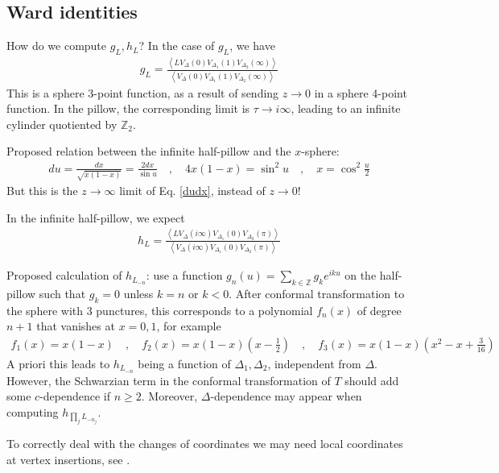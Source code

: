 \documentclass[12pt,a4paper]{article}
\begin{document}
\subsection{Ward identities}

How do we compute $g_L,h_L$? In the case of $g_L$, we have 
\begin{align}
 g_L = \frac{\left< LV_{\Delta}(0)V_{\Delta_1}(1)V_{\Delta_2}(\infty)\right>}{\left< V_{\Delta}(0)V_{\Delta_1}(1)V_{\Delta_2}(\infty)\right>}
\end{align}
This is a sphere 3-point function, as a result of sending $z\to 0$ in a sphere 4-point function. In the pillow, the corresponding limit is $\tau\to i\infty$, leading to an infinite cylinder quotiented by $\mathbb{Z}_2$. 

Proposed relation between the infinite half-pillow and the $x$-sphere:
\begin{align}
 du = \frac{dx}{\sqrt{x(1-x)}} = \frac{2dx}{\sin u} \quad , \quad 4x(1-x) = \sin^2u \quad , \quad x = \cos^2\tfrac{u}{2}
\end{align}
But this is the $z\to\infty$ limit of Eq. \eqref{dudx}, instead of $z\to 0$! 

In the infinite half-pillow, we expect
\begin{align}
 h_L = \frac{\left< LV_{\Delta}(i\infty)V_{\Delta_1}(0)V_{\Delta_2}(\pi)\right>}{\left< V_{\Delta}(i\infty)V_{\Delta_1}(0)V_{\Delta_2}(\pi)\right>}
\end{align}

Proposed calculation of $h_{L_{-n}}$: use a function $g_n(u)=\sum_{k\in\mathbb{Z}}g_k e^{iku} $ on the half-pillow such that $g_k=0$ unless $k=n$ or $k<0$. After conformal transformation to the sphere with 3 punctures, this corresponds to a polynomial $f_n(x)$ of degree $n+1$ that vanishes at $x=0,1$, for example 
\begin{align}
 f_1(x) = x(1-x) \quad , \quad f_2(x) = x(1-x)\left(x-\tfrac12\right) \quad ,\quad f_3(x) = x(1-x)\left(x^2-x+\tfrac{3}{16}\right)
\end{align}
A priori this leads to $h_{L_{-n}}$ being a function of $\Delta_1,\Delta_2$, independent from $\Delta$.
However, the Schwarzian term in the conformal transformation of $T$ should add some $c$-dependence if $n\geq 2$. Moreover, $\Delta$-dependence may appear when computing $h_{\prod_j L_{-n_j}}$. 

To correctly deal with the changes of coordinates we may need local coordinates at vertex insertions, see \cite[Section 6.2]{br21}.
\end{document}
